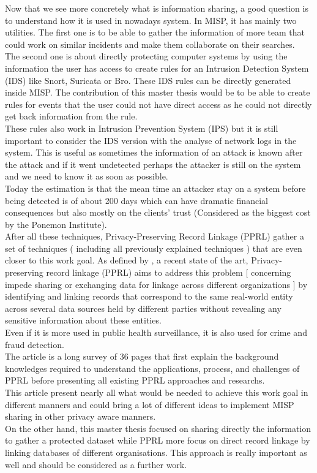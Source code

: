 \documentclass{eplmastersthesis}
\begin{document}
Now that we see more concretely what is information sharing, a good question is to understand how it is used in nowadays system. In MISP, it has mainly two utilities. The first one is to be able to gather the information of more team that could work on similar incidents and make them collaborate on their searches.\\
The second one is about directly protecting computer systems by using the information the user has access to create rules for an Intrusion Detection System (IDS) like Snort, Suricata or Bro. These IDS rules can be directly generated inside MISP. The contribution of this master thesis would be to be able to create rules for events that the user could not have direct access as he could not directly get back information from the rule.\\
These rules also work in Intrusion Prevention System (IPS) but it is still important to consider the IDS version with the analyse of network logs in the system. This is useful as sometimes the information of an attack is known after the attack and if it went undetected perhaps the attacker is still on the system and we need to know it as soon as possible.\\
Today the estimation is that the mean time an attacker stay on a system before being detected is of about 200 days which can have dramatic financial consequences but also mostly on the clients' trust (Considered as the biggest cost by the Ponemon Institute).\\

After all these techniques, Privacy-Preserving Record Linkage (PPRL) gather a set of techniques ( including all previously explained techniques ) that are even closer to this work goal. As defined by \cite{vatsalanprivacy}, a recent state of the art, Privacy-preserving record linkage (PPRL) aims to address this problem [ concerning impede sharing or exchanging data for linkage across different organizations ] by identifying and linking records that correspond to the same real-world entity across several data sources held by different parties without revealing any sensitive information about these entities.\\
Even if it is more used in public health surveillance, it is also used for crime and fraud detection.\\
The article is a long survey of 36 pages that first explain the background knowledges required to understand the applications, process, and challenges of PPRL before presenting all existing PPRL approaches and researchs.\\
This article present nearly all what would be needed to achieve this work goal in different manners and could bring a lot of different ideas to implement MISP sharing in other privacy aware manners.\\
On the other hand, this master thesis focused on sharing directly the information to gather a protected dataset while PPRL more focus on direct record linkage by linking databases of different organisations. This approach is really important as well and should be considered as a further work.
\end{document}
